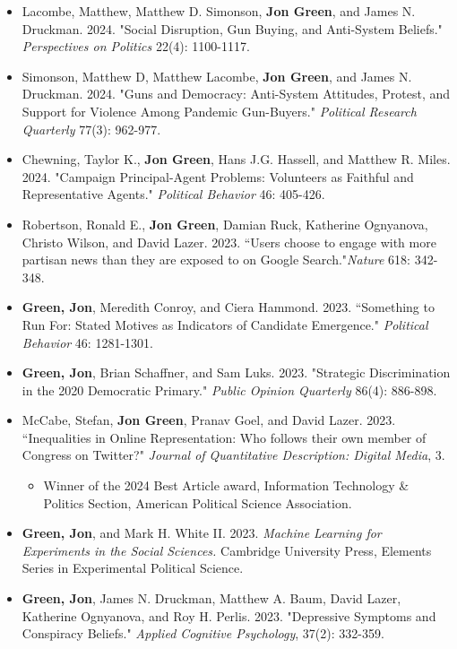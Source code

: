 \documentclass{article}
\begin{document}
\begin{itemize}
		\item Lacombe, Matthew, Matthew D. Simonson, \textbf{Jon Green}, and James N. Druckman. 2024. "Social Disruption, Gun Buying, and Anti-System Beliefs." \textit{Perspectives on Politics} 22(4): 1100-1117.
		\item Simonson, Matthew D, Matthew Lacombe, \textbf{Jon Green}, and James N. Druckman. 2024. "Guns and Democracy: Anti-System Attitudes, Protest, and Support for Violence Among Pandemic Gun-Buyers." \textit{Political Research Quarterly} 77(3): 962-977.
		\item Chewning, Taylor K., \textbf{Jon Green}, Hans J.G. Hassell, and Matthew R. Miles. 2024. "Campaign Principal-Agent Problems: Volunteers as Faithful and Representative Agents." \textit{Political Behavior} 46: 405-426.
		\item Robertson, Ronald E., \textbf{Jon Green}, Damian Ruck, Katherine Ognyanova, Christo Wilson, and David Lazer. 2023. ``Users choose to engage with more partisan news than they are exposed to on Google Search."\textit{Nature} 618: 342-348.
		\item \textbf{Green, Jon}, Meredith Conroy, and Ciera Hammond. 2023. ``Something to Run For: Stated Motives as Indicators of Candidate Emergence." \textit{Political Behavior} 46: 1281-1301.
		\item \textbf{Green, Jon}, Brian Schaffner, and Sam Luks. 2023. "Strategic Discrimination in the 2020 Democratic Primary." \textit{Public Opinion Quarterly} 86(4): 886-898.
		\item McCabe, Stefan, \textbf{Jon Green}, Pranav Goel, and David Lazer. 2023. ``Inequalities in Online Representation: Who follows their own member of Congress on Twitter?" \textit{Journal of Quantitative Description: Digital Media}, 3.
		\begin{itemize}
		\item Winner of the 2024 Best Article award, Information Technology \& Politics Section, American Political Science Association.
		\end{itemize}
		\item \textbf{Green, Jon}, and Mark H. White II. 2023. \textit{Machine Learning for Experiments in the Social Sciences.} Cambridge University Press, Elements Series in Experimental Political Science.
		\item \textbf{Green, Jon}, James N. Druckman, Matthew A. Baum, David Lazer, Katherine Ognyanova, and Roy H. Perlis. 2023. "Depressive Symptoms and Conspiracy Beliefs." \textit{Applied Cognitive Psychology}, 37(2): 332-359. 

\end{itemize}
\end{document}
